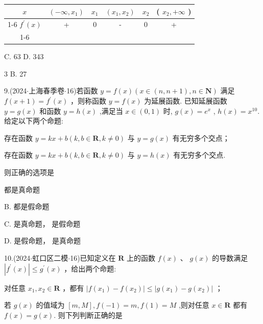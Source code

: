 \begin{center}

\begin{tabular}{|c|c|c|c|c|c|}
\hline
$x$ & $\left( {-\infty ,{x}_{1}}\right)$ & ${x}_{1}$ & $\left( {{x}_{1},{x}_{2}}\right)$ & ${x}_{2}$ & ( ${x}_{2}, + \infty$ ) \\
\cline{1-6}
${f}^{\prime }\left( x\right)$ & + & 0 & - & 0 & + \\
\cline{1-6}
\hline
\end{tabular}
\end{center}

C. 63 D. 343

\xx{}{}{}{}3 B. 27

9.(2024$\cdot$上海春季卷$\cdot$16)若函数 $y = f\left( x\right) \left( {x \in  \left( {n,n + 1}\right) ,n \in  \mathbf{N}}\right)$ 满足 $f\left( {x + 1}\right)  = {f}^{\prime }\left( x\right)$ ，则称函数 $y = f\left( x\right)$ 为延展函数. 已知延展函数 $y = g\left( x\right)$ 和函数 $y = h\left( x\right)$ ,满足当 $x \in  \left( {0,1}\right)$ 时, $g\left( x\right)  = {{e}}^{x}$ , $h\left( x\right)  = {x}^{10}$. 给定以下两个命题:

   存在函数 $y = {kx} + b\left( {k,b \in  \mathbf{R},k \neq  0}\right)$ 与 $y = g\left( x\right)$ 有无穷多个交点；

   存在函数 $y = {kx} + b\left( {k,b \in  \mathbf{R},k \neq  0}\right)$ 与 $y = h\left( x\right)$ 有无穷多个交点.

则正确的选项是 \dotfill{(\kh{})}

\xx{}{}{}{}    都是真命题

B.     都是假命题

C.   是真命题，  是假命题

D.   是假命题，  是真命题

10.(2024$\cdot$虹口区二模$\cdot$16)已知定义在 $\mathbf{R}$ 上的函数 $f\left( x\right)$ 、 $g\left( x\right)$ 的导数满足 $\left| {{f}^{\prime }\left( x\right) }\right|  \leq  {g}^{\prime }\left( x\right)$ ，给出两个命题:

   对任意 ${x}_{1},{x}_{2} \in  \mathbf{R}$ ，都有 $\left| {f\left( {x}_{1}\right)  - f\left( {x}_{2}\right) }\right|  \leq  \left| {g\left( {x}_{1}\right)  - g\left( {x}_{2}\right) }\right|$ ；

   若 $g\left( x\right)$ 的值域为 $\left\lbrack  {m,M}\right\rbrack  ,f\left( {-1}\right)  = m,f\left( 1\right)  = M$ ,则对任意 $x \in  \mathbf{R}$ 都有 $f\left( x\right)  = g\left( x\right)$. 则下列判断正确的是 \dotfill{(\kh{})}

